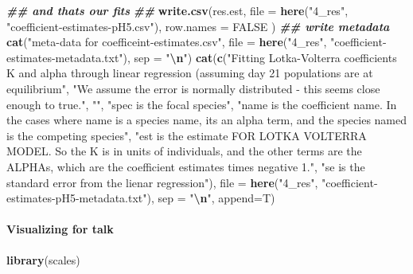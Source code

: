 \documentclass[
]{article}
\newenvironment{Shaded}{\begin{snugshade}}{\end{snugshade}}
\newcommand{\AttributeTok}[1]{\textcolor[rgb]{0.13,0.29,0.53}{#1}}
\newcommand{\ConstantTok}[1]{\textcolor[rgb]{0.56,0.35,0.01}{#1}}
\newcommand{\DocumentationTok}[1]{\textcolor[rgb]{0.56,0.35,0.01}{\textbf{\textit{#1}}}}
\newcommand{\FunctionTok}[1]{\textcolor[rgb]{0.13,0.29,0.53}{\textbf{#1}}}
\newcommand{\NormalTok}[1]{#1}
\newcommand{\SpecialCharTok}[1]{\textcolor[rgb]{0.81,0.36,0.00}{\textbf{#1}}}
\newcommand{\StringTok}[1]{\textcolor[rgb]{0.31,0.60,0.02}{#1}}
\begin{document}
\begin{Shaded}
\begin{Highlighting}[]
\DocumentationTok{\#\# and that\textquotesingle{}s our fits}
\DocumentationTok{\#\# }
\FunctionTok{write.csv}\NormalTok{(res.est, }
          \AttributeTok{file =} \FunctionTok{here}\NormalTok{(}\StringTok{"4\_res"}\NormalTok{,}
                      \StringTok{"coefficient{-}estimates{-}pH5.csv"}\NormalTok{),}
          \AttributeTok{row.names =} \ConstantTok{FALSE}
\NormalTok{)}
\DocumentationTok{\#\# write metadata}
\FunctionTok{cat}\NormalTok{(}\StringTok{"meta{-}data for coefficeint{-}estimates.csv"}\NormalTok{,}
    \AttributeTok{file =} \FunctionTok{here}\NormalTok{(}\StringTok{"4\_res"}\NormalTok{, }\StringTok{"coefficient{-}estimates{-}metadata.txt"}\NormalTok{),}
    \AttributeTok{sep =} \StringTok{"}\SpecialCharTok{\textbackslash{}n}\StringTok{"}\NormalTok{)}
\FunctionTok{cat}\NormalTok{(}\FunctionTok{c}\NormalTok{(}\StringTok{"Fitting Lotka{-}Volterra coefficients K and alpha through linear regression (assuming day 21 populations are at equilibrium"}\NormalTok{,}
      \StringTok{"We assume the error is normally distributed {-} this seems close enough to true."}\NormalTok{,}
      \StringTok{""}\NormalTok{,}
      \StringTok{"spec is the focal species"}\NormalTok{,}
      \StringTok{"name is the coefficient name. In the cases where name is a species name, it\textquotesingle{}s an alpha term, and the species named is the competing species"}\NormalTok{,}
      \StringTok{"est is the estimate FOR LOTKA VOLTERRA MODEL. So the K is in units of individuals, and the other terms are the ALPHAs, which are the coefficient estimates times negative 1."}\NormalTok{,}
      \StringTok{"se is the standard error from the lienar regression"}\NormalTok{),}
    \AttributeTok{file =} \FunctionTok{here}\NormalTok{(}\StringTok{"4\_res"}\NormalTok{, }\StringTok{"coefficient{-}estimates{-}pH5{-}metadata.txt"}\NormalTok{),}
    \AttributeTok{sep =} \StringTok{"}\SpecialCharTok{\textbackslash{}n}\StringTok{"}\NormalTok{,}
    \AttributeTok{append=}\NormalTok{T)}
\end{Highlighting}
\end{Shaded}

\hypertarget{visualizing-for-talk}{%
\paragraph{Visualizing for talk}\label{visualizing-for-talk}}

\begin{Shaded}
\begin{Highlighting}[]
\FunctionTok{library}\NormalTok{(scales)}
\end{Highlighting}
\end{Shaded}
\end{document}
